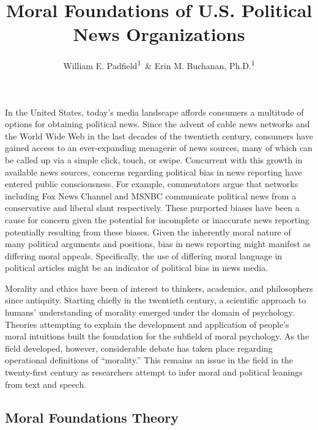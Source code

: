 \documentclass[,man]{apa6}
\title{Moral Foundations of U.S. Political News Organizations}
\author{William E. Padfield\textsuperscript{1}~\& Erin M. Buchanan, Ph.D.\textsuperscript{1}}
\date{}
\affiliation{
\vspace{0.5cm}
\textsuperscript{1} Missouri State University}
\begin{document}
\maketitle

In the United States, today's media landscape affords consumers a multitude of options for obtaining political news. Since the advent of cable news networks and the World Wide Web in the last decades of the twentieth century, consumers have gained access to an ever-expanding menagerie of news sources, many of which can be called up via a simple click, touch, or swipe. Concurrent with this growth in available news sources, concerns regarding political bias in news reporting have entered public consciousness. For example, commentators argue that networks including Fox News Channel and MSNBC communicate political news from a conservative and liberal slant respectively. These purported biases have been a cause for concern given the potential for incomplete or inaccurate news reporting potentially resulting from these biases. Given the inherently moral nature of many political arguments and positions, bias in news reporting might manifest as differing moral appeals. Specifically, the use of differing moral language in political articles might be an indicator of political bias in news media.

Morality and ethics have been of interest to thinkers, academics, and philosophers since antiquity. Starting chiefly in the twentieth century, a scientific approach to humans' understanding of morality emerged under the domain of psychology. Theories attempting to explain the development and application of people's moral intuitions built the foundation for the subfield of moral psychology. As the field developed, however, considerable debate has taken place regarding operational definitions of \enquote{morality.} This remains an issue in the field in the twenty-first century as researchers attempt to infer moral and political leanings from text and speech.

\hypertarget{moral-foundations-theory}{%
\subsection{Moral Foundations Theory}\label{moral-foundations-theory}}
\end{document}
